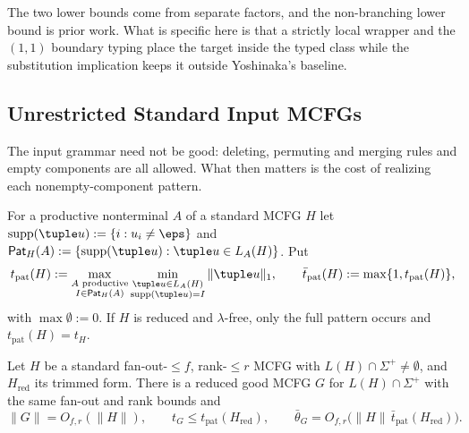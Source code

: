 The two lower bounds come from separate factors, and the non-branching lower bound is
prior work.  What is specific here is that a strictly local wrapper and the $(1,1)$
boundary typing place the target inside the typed class while the substitution
implication keeps it outside Yoshinaka's baseline.


\subsection{Unrestricted Standard Input MCFGs}
\label{subsec:unrestricted-source}

The input grammar need not be good: deleting, permuting and merging rules and
empty components are all allowed.  What then matters is the cost of realizing
each nonempty-component pattern.

\begin{definition}
\label{def:component-pattern-thickness}
For a productive nonterminal $A$ of a standard MCFG $H$ let
$\operatorname{supp}(\tuple u):=\{i:u_i\ne\eps\}$ and
$\mathsf{Pat}_H(A):=\{\operatorname{supp}(\tuple u):\tuple u\in L_A(H)\}$.  Put
\[
 t_{\mathrm{pat}}(H):=
 \max_{\substack{A\text{ productive}\\I\in\mathsf{Pat}_H(A)}}
 \min_{\substack{\tuple u\in L_A(H)\\ \operatorname{supp}(\tuple u)=I}}
 \|\tuple u\|_1 ,
 \qquad
 \bar t_{\mathrm{pat}}(H):=\max\{1,t_{\mathrm{pat}}(H)\},
\]
with $\max\emptyset:=0$.  If $H$ is reduced and $\lambda$-free, only the full
pattern occurs and $t_{\mathrm{pat}}(H)=t_H$.
\end{definition}

\begin{proposition}
\label{prop:pattern-thickness-transfer}
Let $H$ be a standard fan-out-$\le f$, rank-$\le r$ MCFG with
$L(H)\cap\Sigma^+\ne\emptyset$, and $H_{\mathrm{red}}$ its trimmed form.  There is a
reduced good MCFG $G$ for $L(H)\cap\Sigma^+$ with the same fan-out and rank
bounds and
\[
 \|G\|=O_{f,r}(\|H\|),\qquad
 t_G\le t_{\mathrm{pat}}(H_{\mathrm{red}}),\qquad
 \bar\theta_G=O_{f,r}\bigl(\|H\|\,\bar t_{\mathrm{pat}}(H_{\mathrm{red}})\bigr).
\]
\end{proposition}

